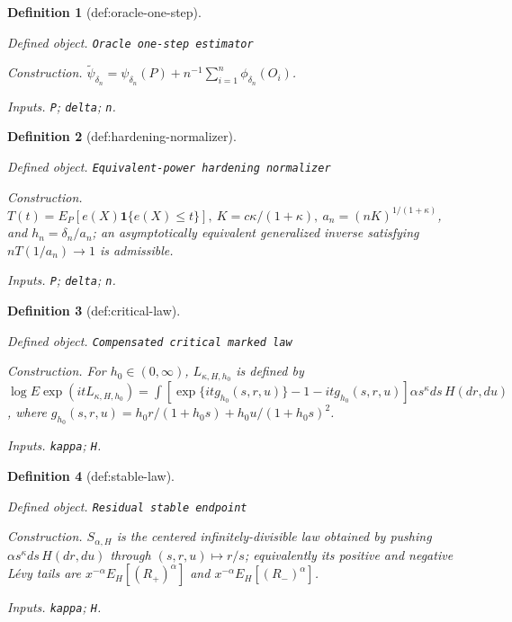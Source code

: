 \documentclass{article}
\newtheorem{definition}{Definition}
\begin{document}
\begin{definition}[def:oracle-one-step]\label{def:oracle-one-step}
\par\smallskip\noindent\emph{Defined object.} \texttt{Oracle one-\allowbreak{}step estimator}
\par\smallskip\noindent\emph{Construction.} \(\widetilde\psi_{\delta_n}=\psi_{\delta_n}(P)+n^{-1}\sum_{i=1}^n\phi_{\delta_n}(O_i)\).
\par\smallskip\noindent\emph{Inputs.} \texttt{P}; \texttt{delta}; \texttt{n}.
\end{definition}

\begin{definition}[def:hardening-normalizer]\label{def:hardening-normalizer}
\par\smallskip\noindent\emph{Defined object.} \texttt{Equivalent-\allowbreak{}power hardening normalizer}
\par\smallskip\noindent\emph{Construction.} \(T(t)=E_P[e(X)\mathbf1\{e(X)\leq t\}],\ K=c\kappa/(1+\kappa),\ a_n=(nK)^{1/(1+\kappa)}\), and \(h_n=\delta_n/a_n\); an asymptotically equivalent generalized inverse satisfying \(nT(1/a_n)\to1\) is admissible.
\par\smallskip\noindent\emph{Inputs.} \texttt{P}; \texttt{delta}; \texttt{n}.
\end{definition}

\begin{definition}[def:critical-law]\label{def:critical-law}
\par\smallskip\noindent\emph{Defined object.} \texttt{Compensated critical marked law}
\par\smallskip\noindent\emph{Construction.} For \(h_0\in(0,\infty)\), \(L_{\kappa,H,h_0}\) is defined by \(\log E\exp(itL_{\kappa,H,h_0})=\int[\exp\{it g_{h_0}(s,r,u)\}-1-it g_{h_0}(s,r,u)]\alpha s^\kappa ds\,H(dr,du)\), where \(g_{h_0}(s,r,u)=h_0r/(1+h_0s)+h_0u/(1+h_0s)^2\).
\par\smallskip\noindent\emph{Inputs.} \texttt{kappa}; \texttt{H}.
\end{definition}

\begin{definition}[def:stable-law]\label{def:stable-law}
\par\smallskip\noindent\emph{Defined object.} \texttt{Residual stable endpoint}
\par\smallskip\noindent\emph{Construction.} \(S_{\alpha,H}\) is the centered infinitely-divisible law obtained by pushing \(\alpha s^\kappa ds\,H(dr,du)\) through \((s,r,u)\mapsto r/s\); equivalently its positive and negative Lévy tails are \(x^{-\alpha}E_H[(R_+)^\alpha]\) and \(x^{-\alpha}E_H[(R_-)^\alpha]\).
\par\smallskip\noindent\emph{Inputs.} \texttt{kappa}; \texttt{H}.
\end{definition}
\end{document}
